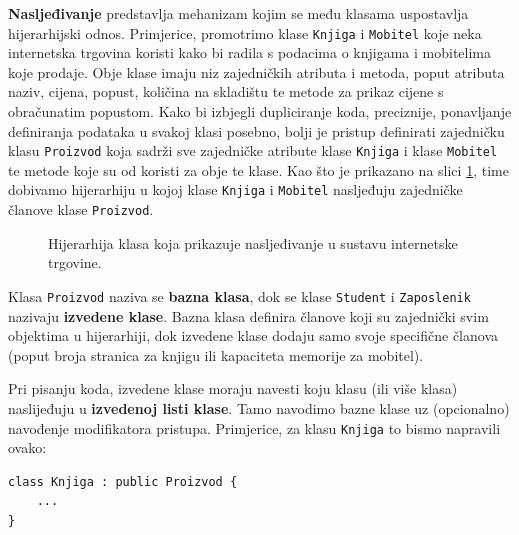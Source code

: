 \textbf{Nasljeđivanje} predstavlja mehanizam kojim se među klasama uspostavlja hijerarhijski odnos. 
Primjerice, promotrimo klase 
\texttt{Knjiga} i \texttt{Mobitel}
koje neka internetska trgovina koristi kako bi radila s podacima o 
knjigama i mobitelima koje prodaje.
Obje klase imaju niz zajedničkih atributa i metoda, 
poput atributa naziv, cijena, popust, količina na skladištu
te metode za prikaz cijene s obračunatim popustom.
Kako bi izbjegli dupliciranje koda, preciznije,
ponavljanje definiranja podataka u svakoj klasi posebno,
bolji je pristup definirati zajedničku klasu \texttt{Proizvod}
koja sadrži sve zajedničke atribute klase \texttt{Knjiga}
i klase \texttt{Mobitel}
te metode koje su od koristi za obje te klase.
Kao što je prikazano na slici \ref{fig:hijerarhija_proizvoda}, time dobivamo
hijerarhiju u kojoj klase
\texttt{Knjiga} i \texttt{Mobitel} nasljeđuju zajedničke članove klase
\texttt{Proizvod}.
\medskip

\begin{figure}[htbp]
\centering
{}
\caption{Hijerarhija klasa koja prikazuje nasljeđivanje u sustavu internetske trgovine.}
\label{fig:hijerarhija_proizvoda}
\end{figure}

Klasa \texttt{Proizvod} naziva se \textbf{bazna klasa}, dok se klase 
\texttt{Student} i \texttt{Zaposlenik} nazivaju 
\textbf{izvedene klase}. 
Bazna klasa definira članove koji su zajednički svim objektima u hijerarhiji, dok izvedene klase dodaju samo svoje specifične članova
(poput broja stranica za knjigu ili kapaciteta memorije za mobitel).
\medskip

Pri pisanju koda, izvedene klase moraju navesti koju klasu (ili više klasa)
naslijeđuju u \textbf{izvedenoj listi klase}.
Tamo navodimo bazne klase uz (opcionalno) navođenje modifikatora pristupa.
Primjerice, za klasu \texttt{Knjiga}
to bismo napravili ovako:
\begin{verbatim}
class Knjiga : public Proizvod {
    ...
}
\end{verbatim}

